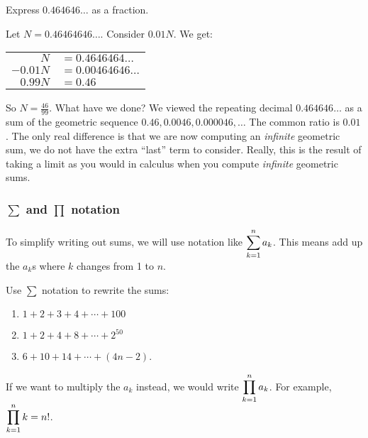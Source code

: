 \documentclass[12pt]{article}
\begin{document}
\begin{example}
  Express $0.464646\ldots$ as a fraction.
  
  \begin{solution}
    Let $N = 0.46464646\ldots$.  Consider $0.01N$.  We get:
    
    \begin{center}
    \begin{tabular}{rl}
     $N$ &$ = 0.4646464\ldots$\\
     $-0.01N$ &$ = 0.00464646\ldots$\\ \hline
     $0.99N$ & $ = 0.46$
    \end{tabular}
    \end{center}
    So $N = \frac{46}{99}$.  What have we done?  We viewed the repeating decimal $0.464646\ldots$ as a sum of the geometric sequence $0.46, 0.0046, 0.000046, \ldots$  The common ratio is $0.01$.  The only real difference is that we are now computing an {\em infinite} geometric sum, we do not have the extra ``last'' term to consider.  Really, this is the result of taking a limit as you would in calculus when you compute \emph{infinite} geometric sums.
  \end{solution}

\end{example}


\subsubsection*{$\sum$ and $\prod$ notation}

To simplify writing out sums, we will use notation like $\displaystyle\sum_{k=1}^n a_k$.  This means add up the $a_k$s where $k$ changes from 1 to $n$.

\begin{example}
  Use $\sum$ notation to rewrite the sums:
  \begin{enumerate}
    \item $1 + 2 + 3 + 4 + \cdots + 100$
    \item $1 + 2 + 4 + 8 + \cdots + 2^{50}$
    \item $6 + 10 + 14 + \cdots + (4n - 2)$.
  \end{enumerate}
\end{example}


If we want to multiply the $a_k$ instead, we would write $\displaystyle\prod_{k=1}^n a_k$.  For example, $\displaystyle\prod_{k=1}^n k = n!$.
\end{document}
